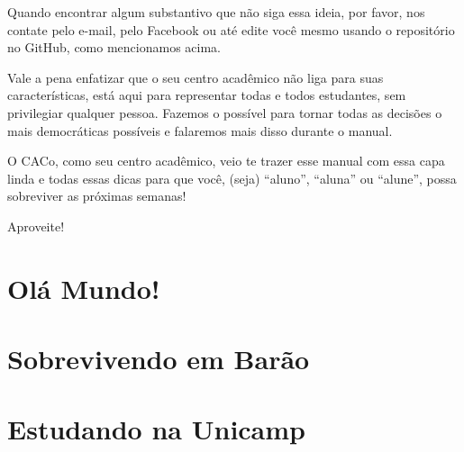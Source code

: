 \documentclass[a4paper,10pt,oldfontcommands]{memoir}
\begin{document}
Quando encontrar algum substantivo que não siga essa ideia, por favor, nos
contate pelo e-mail, pelo Facebook ou até edite você mesmo usando o repositório
no GitHub, como mencionamos acima.

Vale a pena enfatizar que o seu centro acadêmico não liga para suas
características, está aqui para representar todas e todos estudantes, sem
privilegiar qualquer pessoa. Fazemos o possível para tornar todas as decisões
o mais democráticas possíveis e falaremos mais disso durante o manual.

O CACo, como seu centro acadêmico, veio te trazer esse manual com essa capa
linda e todas essas dicas para que você, (seja) ``aluno'', ``aluna'' ou
``alune'', possa sobreviver as próximas semanas!

Aproveite!

\setlength{\parskip}{0em}
\mainmatter
\pagestyle{headings}
\twocolumn
\chapter{Olá Mundo!}


\clearpage

\onecolumn

\clearpage


\clearpage

\twocolumn


\chapter{Sobrevivendo em Barão}

\newpage

\newpage

\newpage

\newpage


\chapter{Estudando na Unicamp}

\newpage

\newpage

\newpage

\newpage

\newpage

\newpage

\newpage

\newpage

\end{document}
